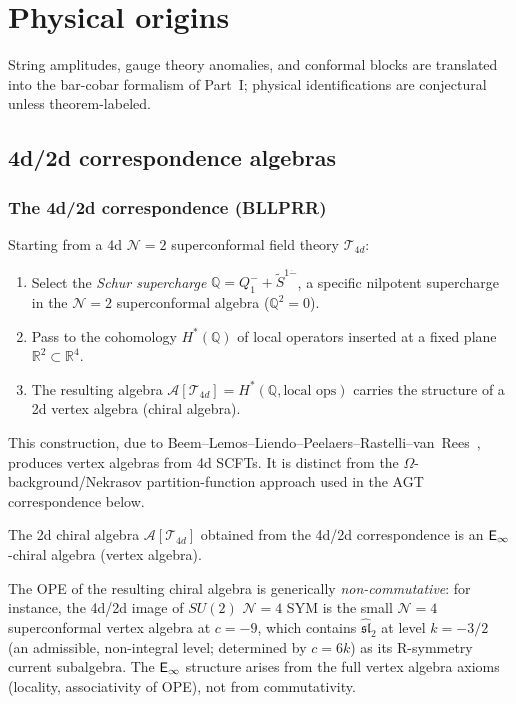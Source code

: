 
\chapter{Physical origins}
\label{chap:physical-origins}
\label{rem:programme-origins}


String amplitudes, gauge theory anomalies, and conformal blocks are translated into the bar-cobar formalism of Part~I; physical identifications are conjectural unless theorem-labeled.
\section{4d/2d correspondence algebras}
\label{sec:4d2d}

\subsection{The 4d/2d correspondence (BLLPRR)}

\begin{construction}\label{constr:4d2d}
Starting from a 4d $\mathcal{N} = 2$ superconformal field theory $\mathcal{T}_{4d}$:
\begin{enumerate}[label=(\roman*)]
\item Select the \emph{Schur supercharge} $\mathbb{Q} = Q_1^- + \widetilde{S}^{1\dot{-}}$, a specific nilpotent supercharge in the $\mathcal{N}=2$ superconformal algebra ($\mathbb{Q}^2 = 0$).
\item Pass to the cohomology $H^*(\mathbb{Q})$ of local operators inserted at a fixed plane $\mathbb{R}^2 \subset \mathbb{R}^4$.
\item The resulting algebra $\mathcal{A}[\mathcal{T}_{4d}] = H^*(\mathbb{Q}, \text{local ops})$ carries the structure of a 2d vertex algebra (chiral algebra).
\end{enumerate}

This construction, due to Beem--Lemos--Liendo--Peelaers--Rastelli--van~Rees~\cite{beem-et-al}, produces vertex algebras from 4d SCFTs.
It is distinct from the $\Omega$-background/Nekrasov partition-function
approach used in the AGT correspondence below.
\end{construction}

\begin{theorem}\label{thm:4d2d-einf}
The 2d chiral algebra $\mathcal{A}[\mathcal{T}_{4d}]$ obtained from the 4d/2d
correspondence is an $\mathsf{E}_{\infty}$-chiral algebra (vertex algebra).

The OPE of the resulting chiral algebra is generically \emph{non-commutative}: for instance, the 4d/2d image of $SU(2)$ $\mathcal{N}=4$ SYM is the small $\mathcal{N}=4$ superconformal vertex algebra at $c = -9$, which contains $\widehat{\mathfrak{sl}}_2$ at level $k = -3/2$ (an admissible, non-integral level; determined by $c = 6k$) as its R-symmetry current subalgebra.  The $\mathsf{E}_{\infty}$ structure arises from the full vertex algebra axioms (locality, associativity of OPE), not from commutativity.
\end{theorem}

